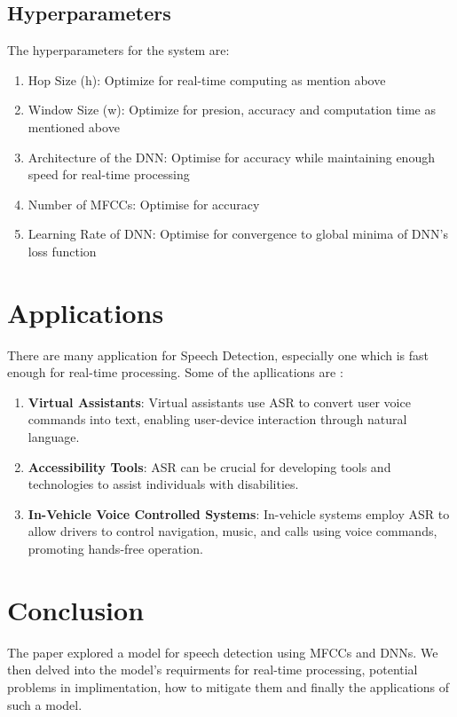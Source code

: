 \documentclass[%
 reprint,
 amsmath,amssymb,
 aps,
]{revtex4-2}
\begin{document}
\subsection{Hyperparameters}
The hyperparameters for the system are:

\begin{enumerate}
    \item Hop Size (h): Optimize for real-time computing as mention above
    \item Window Size (w): Optimize for presion, accuracy and computation time as mentioned above
    \item Architecture of the DNN: Optimise for accuracy while maintaining enough speed for real-time processing
    \item Number of MFCCs: Optimise for accuracy
    \item Learning Rate of DNN: Optimise for convergence to global minima of DNN's loss function
\end{enumerate}



\section{Applications}
There are many application for Speech Detection, especially one which is fast enough for
real-time processing. Some of the apllications are \cite{juang2005automatic}:

\begin{enumerate}
    \item \textbf{Virtual Assistants}: Virtual assistants use ASR to convert user voice commands into text, enabling user-device interaction through natural language.
    \item \textbf{Accessibility Tools}: ASR can be crucial for developing tools and technologies to assist individuals with disabilities.
    \item \textbf{In-Vehicle Voice Controlled Systems}: In-vehicle systems employ ASR to allow drivers to control navigation, music, and calls using voice commands, promoting hands-free operation.
\end{enumerate}




\section{Conclusion}
The paper explored a model for speech detection using MFCCs and DNNs. We then delved into the model's requirments
for real-time processing, potential problems in implimentation, how to mitigate them and finally the
applications of such a model.



\end{document}
